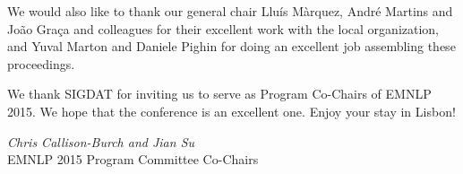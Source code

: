 We would also like to thank our general chair Lluís Màrquez, André
Martins and João Graça and colleagues for their excellent work with
the local organization, and Yuval Marton and Daniele Pighin for doing
an excellent job assembling these proceedings.

We thank SIGDAT for inviting us to serve as Program Co-Chairs of EMNLP
2015. We hope that the conference is an excellent one. Enjoy your
stay in Lisbon! 

\begin{flushright}
\emph{Chris Callison-Burch and Jian Su} 
\\
 EMNLP 2015 Program Committee Co-Chairs 
\par\end{flushright}

\clearpage{}


